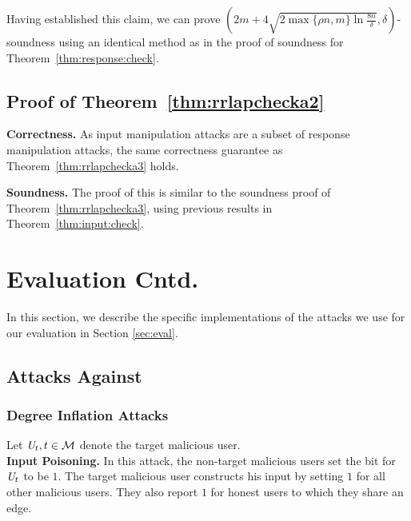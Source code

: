 Having established this claim, we can prove $(2m + 4\sqrt{2 \max\{\rho n, m\} \ln \frac{8n}{\delta}}, \delta)$-soundness using an identical method as in the proof of soundness for Theorem~\ref{thm:response:check}.

\subsection{Proof of Theorem~\ref{thm:rrlapchecka2}}\label{app:thm:rrlapchecka2}
\textbf{Correctness.} As input manipulation attacks are a subset of response manipulation attacks, the same correctness guarantee as Theorem~\ref{thm:rrlapchecka3} holds.

\textbf{Soundness.}
The proof of this is similar to the soundness proof of Theorem~\ref{thm:rrlapchecka3}, using previous results in Theorem~\ref{thm:input:check}.



\section{Evaluation Cntd.}\label{app:attacks}
In this section, we describe the specific implementations of the attacks we use for our evaluation in Section \ref{sec:eval}.

\subsection{Attacks Against \DegRRCheck{}}

\subsubsection{Degree Inflation Attacks}
Let $\textit{U}_t, t \in \mathcal{M}$ denote the target malicious user. 
\\
\noindent\textbf{Input Poisoning.} In this attack, the non-target malicious users set the bit for $\textit{U}_t$ to be $1$. The target malicious user constructs his input by setting $1$ for all other malicious users. They also report $1$ for honest users to which they share an edge. 

